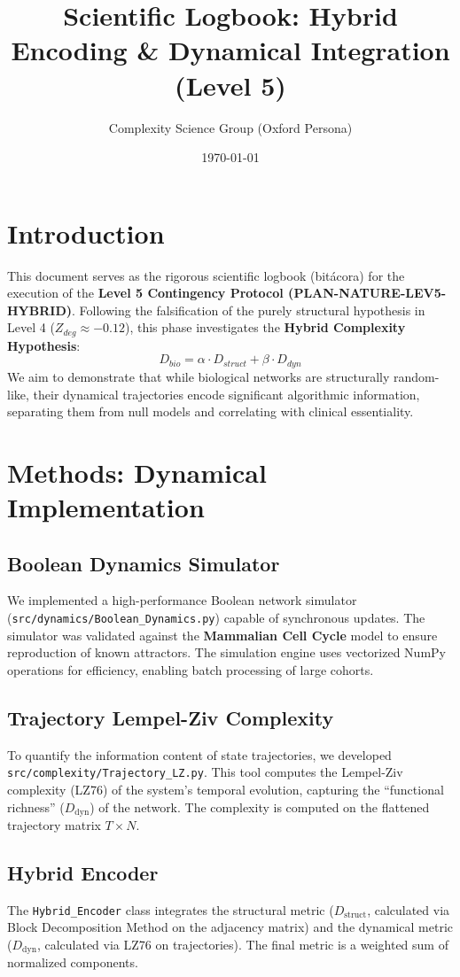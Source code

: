 \documentclass{article}
\title{Scientific Logbook: Hybrid Encoding \& Dynamical Integration (Level 5)}
\author{Complexity Science Group (Oxford Persona)}
\date{\today}
\begin{document}
\maketitle

\tableofcontents

\section{Introduction}
This document serves as the rigorous scientific logbook (bitácora) for the execution of the \textbf{Level 5 Contingency Protocol (PLAN-NATURE-LEV5-HYBRID)}. Following the falsification of the purely structural hypothesis in Level 4 ($Z_{deg} \approx -0.12$), this phase investigates the \textbf{Hybrid Complexity Hypothesis}:
\[ D_{bio} = \alpha \cdot D_{struct} + \beta \cdot D_{dyn} \]
We aim to demonstrate that while biological networks are structurally random-like, their dynamical trajectories encode significant algorithmic information, separating them from null models and correlating with clinical essentiality.

\section{Methods: Dynamical Implementation}

\subsection{Boolean Dynamics Simulator}
We implemented a high-performance Boolean network simulator (\texttt{src/dynamics/Boolean\_Dynamics.py}) capable of synchronous updates. The simulator was validated against the \textbf{Mammalian Cell Cycle} model to ensure reproduction of known attractors. The simulation engine uses vectorized NumPy operations for efficiency, enabling batch processing of large cohorts.

\subsection{Trajectory Lempel-Ziv Complexity}
To quantify the information content of state trajectories, we developed \texttt{src/complexity/Trajectory\_LZ.py}. This tool computes the Lempel-Ziv complexity (LZ76) of the system's temporal evolution, capturing the ``functional richness'' ($D_{\text{dyn}}$) of the network. The complexity is computed on the flattened trajectory matrix $T \times N$.

\subsection{Hybrid Encoder}
The \texttt{Hybrid\_Encoder} class integrates the structural metric ($D_{\text{struct}}$, calculated via Block Decomposition Method on the adjacency matrix) and the dynamical metric ($D_{\text{dyn}}$, calculated via LZ76 on trajectories). The final metric is a weighted sum of normalized components.
\end{document}

